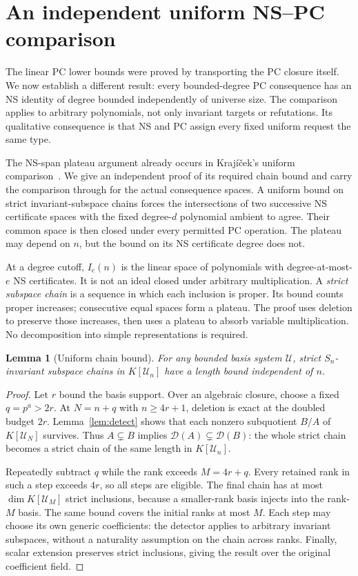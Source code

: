\documentclass[11pt,a4paper]{article}
\newtheorem{lemma}[theorem]{Lemma}
\theoremstyle{definition}\newtheorem{definition}[theorem]{Definition}
\theoremstyle{remark}\newtheorem{remark}[theorem]{Remark}
\begin{document}
\section{An independent uniform NS--PC comparison}\label{sec:comparison}
The linear PC lower bounds were proved by transporting the PC closure
itself. We now establish a different result: every bounded-degree PC
consequence has an NS identity of degree bounded independently of
universe size. The comparison applies to arbitrary polynomials, not
only invariant targets or refutations. Its qualitative consequence is
that NS and PC assign every fixed uniform request the same type.

The NS-span plateau argument already occurs in Kraj\'i\v cek's
uniform comparison~\cite[Theorem~5.5]{Krajicek}. We give an independent
proof of its required chain bound and carry the comparison through for
the actual consequence spaces. A uniform bound on strict
invariant-subspace chains forces the intersections of two successive
NS certificate spaces with the fixed degree-$d$ polynomial ambient
to agree. Their common
space is then closed under every permitted PC operation. The plateau
may depend on $n$, but the bound on its NS certificate degree does not.

At a degree cutoff, $I_e(n)$ is the linear space of polynomials with
degree-at-most-$e$ NS certificates. It is not an ideal closed under
arbitrary multiplication.
A \emph{strict subspace chain} is a sequence in which each inclusion
is proper. Its bound counts proper increases; consecutive equal
spaces form a plateau. The proof uses deletion to preserve those
increases, then uses a plateau to absorb variable multiplication.
No decomposition into simple representations is required.

\begin{lemma}[Uniform chain bound]\label{lem:chains}
For any bounded basis system $\mathcal U$, strict $S_n$-invariant
subspace chains in $K[\mathcal U_n]$ have a length bound independent of $n$.
\end{lemma}
\begin{proof}
Let $r$ bound the basis support. Over an algebraic closure, choose a
fixed $q=p^a>2r$. At $N=n+q$ with $n\ge4r+1$, deletion is exact at the
doubled budget $2r$. Lemma~\ref{lem:detect} shows that each nonzero
subquotient $B/A$ of $K[\mathcal U_N]$ survives. Thus
$A\subsetneq B$ implies
$\mathcal D(A)\subsetneq\mathcal D(B)$: the whole strict chain becomes
a strict chain of the same length in $K[\mathcal U_n]$.

Repeatedly subtract $q$ while the rank exceeds $M=4r+q$. Every retained
rank in such a step exceeds $4r$, so all steps are eligible. The final
chain has at most $\dim K[\mathcal U_M]$ strict inclusions, because a
smaller-rank basis injects into the rank-$M$ basis. The same bound covers
the initial ranks at most $M$. Each step may choose its own generic
coefficients: the detector applies to arbitrary invariant subspaces,
without a naturality assumption on the chain across ranks. Finally,
scalar extension preserves strict inclusions, giving the result over
the original coefficient field.
\end{proof}
\end{document}
